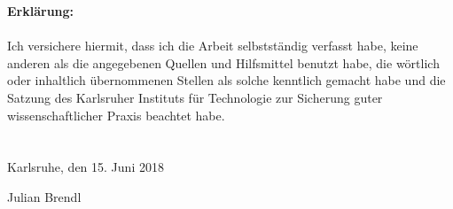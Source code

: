 \documentclass[english, ngerman]{KITreprt}
\renewcommand{\myname}{Julian Brendl}
\begin{document}

\maketitle

\thispagestyle{empty}
\newpage
\vspace*{\fill}
\noindent
\textbf{Erkl\"arung:}\\
\\
\noindent
Ich versichere hiermit, dass ich die Arbeit selbstst\"andig verfasst habe, keine anderen als die angegebenen Quellen und Hilfsmittel benutzt habe, die w\"ortlich oder inhaltlich \"ubernommenen
Stellen als solche kenntlich gemacht habe und die Satzung des Karlsruher Instituts f\"ur Technologie zur Sicherung guter wissenschaftlicher Praxis beachtet habe.\\
\\
\\
\noindent
Karlsruhe, den 15. Juni 2018
\begin{flushright}

\myname
\end{flushright}

\vspace*{\fill}
\cleardoublepage
\end{document}
